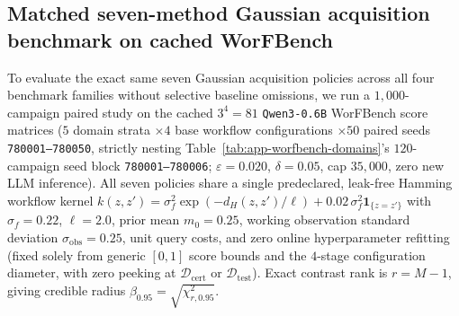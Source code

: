 \documentclass{article}
\theoremstyle{plain}
\theoremstyle{definition}
\begin{document}
\subsection{Matched seven-method Gaussian acquisition benchmark on cached WorFBench}
\label{app:v15-worfbench}

To evaluate the exact same seven Gaussian acquisition policies across all four benchmark families without selective baseline omissions, we run a $1{,}000$-campaign paired study on the cached $3^4=81$ \texttt{Qwen3-0.6B} WorFBench score matrices ($5$ domain strata $\times 4$ base workflow configurations $\times 50$ paired seeds \texttt{780001--780050}, strictly nesting Table~\ref{tab:app-worfbench-domains}'s $120$-campaign seed block \texttt{780001--780006}; $\varepsilon=0.020$, $\delta=0.05$, cap $35{,}000$, zero new LLM inference). All seven policies share a single predeclared, leak-free Hamming workflow kernel $k(z,z')=\sigma_f^2\exp(-d_H(z,z')/\ell)+0.02\,\sigma_f^2\mathbf{1}_{\{z=z'\}}$ with $\sigma_f=0.22$, $\ell=2.0$, prior mean $m_0=0.25$, working observation standard deviation $\sigma_{\mathrm{obs}}=0.25$, unit query costs, and zero online hyperparameter refitting (fixed solely from generic $[0,1]$ score bounds and the $4$-stage configuration diameter, with zero peeking at $\mathcal D_{\mathrm{cert}}$ or $\mathcal D_{\mathrm{test}}$). Exact contrast rank is $r=M-1$, giving credible radius $\beta_{0.95}=\sqrt{\chi^2_{r,0.95}}$.
\end{document}
